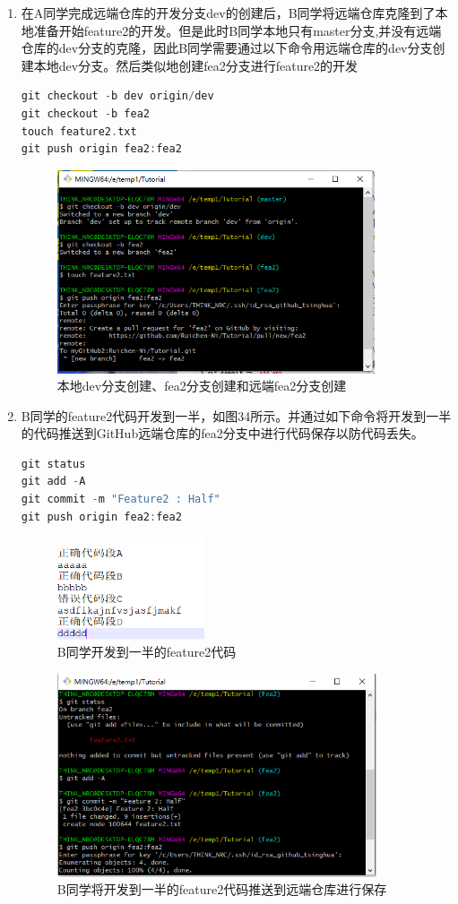 \documentclass[a4paper,14pt]{article}
\begin{document}
\begin{enumerate}[1. ]
\item 在A同学完成远端仓库的开发分支dev的创建后，B同学将远端仓库克隆到了本地准备开始feature2的开发。但是此时B同学本地只有master分支,并没有远端仓库的dev分支的克隆，因此B同学需要通过以下命令用远端仓库的dev分支创建本地dev分支。然后类似地创建fea2分支进行feature2的开发
{\color{red}
\begin{lstlisting}[language=C]
git checkout -b dev origin/dev
git checkout -b fea2
touch feature2.txt
git push origin fea2:fea2
\end{lstlisting}
}
\begin{figure}[h]
\centering
\includegraphics[height=6cm]{figure/stepB1}
\caption{本地dev分支创建、fea2分支创建和远端fea2分支创建}
\end{figure}

\newpage
\item B同学的feature2代码开发到一半，如图34所示。并通过如下命令将开发到一半的代码推送到GitHub远端仓库的fea2分支中进行代码保存以防代码丢失。
{\color{red}
\begin{lstlisting}[language=C]
git status
git add -A
git commit -m "Feature2 : Half"
git push origin fea2:fea2
\end{lstlisting}
}
\begin{figure}[h]
\centering
\includegraphics[height=3cm]{figure/stepB2}
\caption{B同学开发到一半的feature2代码}
\end{figure}
\begin{figure}[h]
\centering
\includegraphics[height=6cm]{figure/stepB3}
\caption{B同学将开发到一半的feature2代码推送到远端仓库进行保存}
\end{figure}


\end{enumerate}
\end{document}
